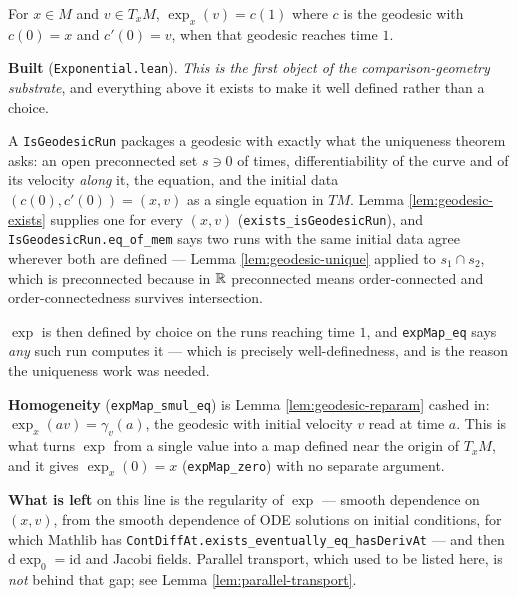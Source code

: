 \begin{definition}
  \label{def:exp}
  \leanok
  For $x \in M$ and $v \in T_xM$, $\exp_x(v) = c(1)$ where $c$ is the geodesic with
  $c(0) = x$ and $c'(0) = v$, when that geodesic reaches time $1$.

  \textbf{Built} (\texttt{Exponential.lean}). \emph{This is the first object of the
  comparison-geometry substrate}, and everything above it exists to make it well defined rather
  than a choice.

  A \texttt{IsGeodesicRun} packages a geodesic with exactly what the uniqueness theorem asks: an
  open preconnected set $s \ni 0$ of times, differentiability of the curve and of its velocity
  \emph{along} it, the equation, and the initial data $(c(0),c'(0)) = (x,v)$ as a single
  equation in $TM$. Lemma \ref{lem:geodesic-exists} supplies one for every $(x,v)$
  (\texttt{exists\_isGeodesicRun}), and \texttt{IsGeodesicRun.eq\_of\_mem} says two runs with the
  same initial data agree wherever both are defined --- Lemma \ref{lem:geodesic-unique} applied
  to $s_1 \cap s_2$, which is preconnected because in $\mathbb{R}$ preconnected means order-connected
  and order-connectedness survives intersection.

  $\exp$ is then defined by choice on the runs reaching time $1$, and
  \texttt{expMap\_eq} says \emph{any} such run computes it --- which is precisely
  well-definedness, and is the reason the uniqueness work was needed.

  \textbf{Homogeneity} (\texttt{expMap\_smul\_eq}) is Lemma \ref{lem:geodesic-reparam} cashed
  in: $\exp_x(av) = \gamma_v(a)$, the geodesic with initial velocity $v$ read at time $a$. This
  is what turns $\exp$ from a single value into a map defined near the origin of $T_xM$, and it
  gives $\exp_x(0) = x$ (\texttt{expMap\_zero}) with no separate argument.

  \textbf{What is left} on this line is the regularity of $\exp$ --- smooth dependence on
  $(x,v)$, from the smooth dependence of ODE solutions on initial conditions, for which Mathlib
  has \texttt{ContDiffAt.exists\_eventually\_eq\_hasDerivAt} --- and then $\mathrm{d}\exp_0 =
  \mathrm{id}$ and Jacobi fields. Parallel transport, which used to be listed here, is
  \emph{not} behind that gap; see Lemma \ref{lem:parallel-transport}.
\end{definition}

